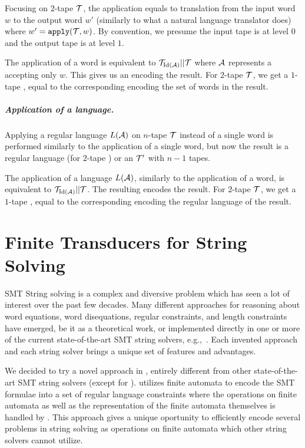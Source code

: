 Focusing on $2$-tape \nfts $\mathcal{T}$, the application equals to translation from the input word $w$ to the output word $w'$ (similarly to what a natural language translator does) where $w' = \texttt{apply}(\mathcal{T}, w)$.
By convention, we presume the input tape is at level $0$ and the output tape is at level $1$.

The application of a word is equivalent to $\mathcal{T}_{\text{Id}(\mathcal{A})} || \mathcal{T}$ where $\mathcal{A}$ represents a \dfa accepting only $w$.
This gives us an \nft encoding the result.
For $2$-tape $\mathcal{T}$, we get a $1$-tape \nft, equal to the corresponding \nfa encoding the set of words in the result.

\paragraph{Application of a language.}
Applying a regular language $L(\mathcal{A})$ on $n$-tape \nft $\mathcal{T}$ instead of a single word is performed similarly to the application of a single word, but now the result is a regular language (for $2$-tape \nfts) or an \nft $\mathcal{T}'$ with $n-1$ tapes.

The application of a language $L(\mathcal{A})$, similarly to the application of a word, is equivalent to $\mathcal{T}_{\text{Id}(\mathcal{A})} || \mathcal{T}$.
The resulting \nft encodes the result.
For $2$-tape $\mathcal{T}$, we get a $1$-tape \nft, equal to the corresponding \nfa encoding the regular language of the result.



\chapter{Finite Transducers for String Solving}

SMT String solving is a complex and diversive problem which has seen a lot of interest over the past few decades.
Many different approaches for reasoning about word equations, word disequations, regular constraints, and length constraints have emerged, be it as a theoretical work, or implemented directly in one or more of the current state-of-the-art SMT string solvers, e.g.,~\cite{cvc4,cvc5,z3,Z3-str,Z3Str3,Z3str4,Trau,fm23_equations_synergy_regular_constraints_DBLP:conf/fm/BlahoudekCCHHLS23, tacas24_noodler_10.1007/978-3-031-57246-3_2, oopsla23_stabilization_DBLP:journals/pacmpl/ChenCHHLS23}.
Each invented approach and each string solver brings a unique set of features and advantages.

We decided to try a novel approach in \noodler, entirely different from other state-of-the-art SMT string solvers (except for \ostrich).
\noodler utilizes finite automata to encode the SMT formulae into a set of regular language constraints where the operations on finite automata as well as the representation of the finite automata themselves is handled by \mata.
This approach gives \noodler a unique oportunity to efficiently encode several problems in string solving as operations on finite automata which other string solvers cannot utilize.

